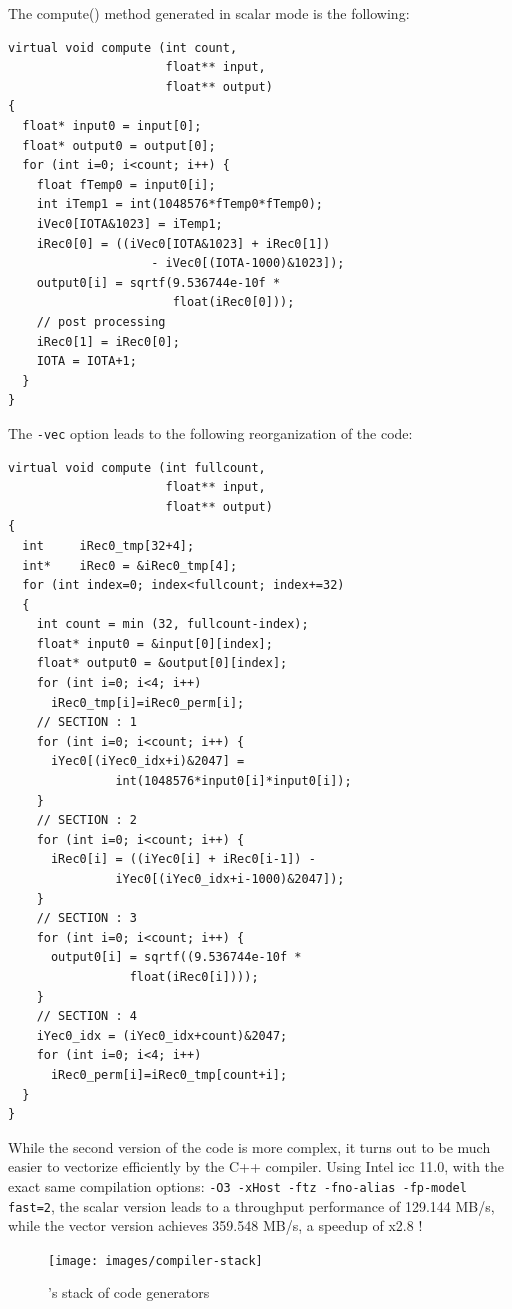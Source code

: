 \documentclass[a4paper,10pt]{book}
\begin{document}
The compute() method generated in scalar mode is the following:

\begin{lstlisting}
virtual void compute (int count, 
                      float** input, 
                      float** output) 
{
  float* input0 = input[0];
  float* output0 = output[0];
  for (int i=0; i<count; i++) {
    float fTemp0 = input0[i];
    int iTemp1 = int(1048576*fTemp0*fTemp0);
    iVec0[IOTA&1023] = iTemp1;
    iRec0[0] = ((iVec0[IOTA&1023] + iRec0[1])
                    - iVec0[(IOTA-1000)&1023]);
    output0[i] = sqrtf(9.536744e-10f * 
                       float(iRec0[0]));
    // post processing
    iRec0[1] = iRec0[0];
    IOTA = IOTA+1;
  }
}
\end{lstlisting}

The \lstinline!-vec! option leads to the following reorganization of the code:
\begin{lstlisting}
virtual void compute (int fullcount, 
                      float** input, 
                      float** output) 
{
  int     iRec0_tmp[32+4];
  int*    iRec0 = &iRec0_tmp[4];
  for (int index=0; index<fullcount; index+=32) 
  {
    int count = min (32, fullcount-index);
    float* input0 = &input[0][index];
    float* output0 = &output[0][index];
    for (int i=0; i<4; i++) 
      iRec0_tmp[i]=iRec0_perm[i];
    // SECTION : 1
    for (int i=0; i<count; i++) {
      iYec0[(iYec0_idx+i)&2047] =
               int(1048576*input0[i]*input0[i]);
    }
    // SECTION : 2
    for (int i=0; i<count; i++) {
      iRec0[i] = ((iYec0[i] + iRec0[i-1]) - 
               iYec0[(iYec0_idx+i-1000)&2047]);
    }
    // SECTION : 3
    for (int i=0; i<count; i++) {
      output0[i] = sqrtf((9.536744e-10f * 
                 float(iRec0[i])));
    }
    // SECTION : 4
    iYec0_idx = (iYec0_idx+count)&2047;
    for (int i=0; i<4; i++)
      iRec0_perm[i]=iRec0_tmp[count+i];
  }
}
\end{lstlisting}

While the second version of the code is more complex, it turns out to be much easier to vectorize efficiently by the C++ compiler. Using Intel icc 11.0, with the exact same compilation options: \texttt{-O3 -xHost -ftz -fno-alias -fp-model fast=2}, the scalar version leads to a throughput performance of 129.144  MB/s, while the vector version achieves 359.548  MB/s, a speedup of x2.8 ! 

\begin{figure}[htb]
  \centering
  \texttt{[image: images/compiler-stack]}
  \caption{\faust's stack of code generators}   
  \label{fig:stack}
\end{figure}
\end{document}
